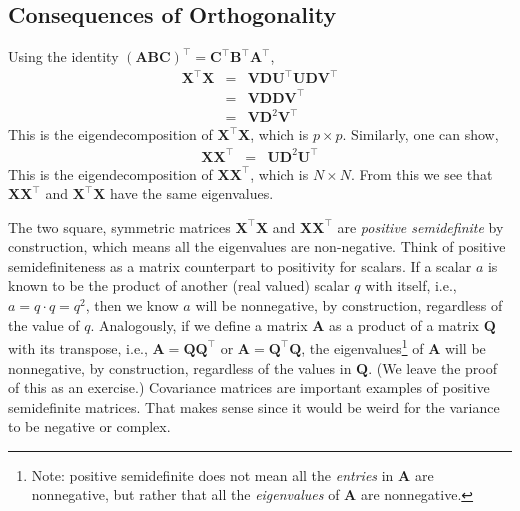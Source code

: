 \documentclass[a4paper]{article}
\begin{document}
\subsection{Consequences of Orthogonality}
Using the identity $(\mathbf{A}\mathbf{B}\mathbf{C})^\top=\mathbf{C}^\top\mathbf{B}^\top\mathbf{A}^\top$,
\begin{eqnarray*}
\mathbf{X}^\top \mathbf{X} &=& \mathbf{VD}\mathbf{U}^\top\mathbf{UD}\mathbf{V}^\top\\
 &=& \mathbf{VDD}\mathbf{V}^\top\\
 &=& \mathbf{V}\mathbf{D}^{2} \mathbf{V}^\top
\end{eqnarray*}
This is the eigendecomposition of $\mathbf{X}^\top \mathbf{X}$, which is $p\times p$.  Similarly, one can show,
\begin{eqnarray*}
\mathbf{X}\mathbf{X}^\top &=& \mathbf{U}\mathbf{D}^{2} \mathbf{U}^\top
\end{eqnarray*}
This is the eigendecomposition of $\mathbf{X} \mathbf{X}^\top$, which is $N\times N$.  From this we see that $\mathbf{X}\mathbf{X}^\top$ and $\mathbf{X}^\top\mathbf{X}$ have the same eigenvalues. 

The two square, symmetric matrices $\mathbf{X}^\top \mathbf{X}$ and $\mathbf{X} \mathbf{X}^\top$ are \emph{positive semidefinite} by construction, which means all the eigenvalues are non-negative.  Think of positive semidefiniteness as a matrix counterpart to positivity for scalars.  If a scalar $a$ is known to be the product of another (real valued) scalar $q$ with itself, i.e., $a=q\cdot q=q^2$, then we know $a$ will be nonnegative, by construction, regardless of the value of $q$.  Analogously, if we define a matrix $\mathbf{A}$ as a product of a matrix $\mathbf{Q}$ with its transpose, i.e., $\mathbf{A}=\mathbf{Q}\mathbf{Q}^\top$ or $\mathbf{A}=\mathbf{Q}^\top\mathbf{Q}$, the eigenvalues\footnote{Note: positive semidefinite does not mean all the \emph{entries} in $\mathbf{A}$ are nonnegative, but rather that all the \emph{eigenvalues} of $\mathbf{A}$ are nonnegative.} of $\mathbf{A}$ will be nonnegative, by construction, regardless of the values in $\mathbf{Q}$.  (We leave the proof of this as an exercise.)  Covariance matrices are important examples of positive semidefinite matrices. That makes sense since it would be weird for the variance to be negative or complex.
\end{document}
